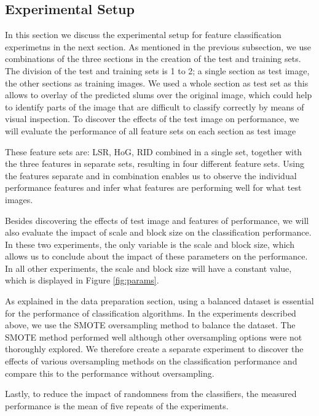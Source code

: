 \subsection{Experimental Setup}

In this section we discuss the experimental setup for feature classification experimetns in the next section. As mentioned in the previous subsection, we use combinations of the three sections in the creation of the test and training sets. The division of the test and training sets is 1 to 2; a single section as test image, the other sections as training images. We used a whole section as test set as this allows to overlay of the predicted slums over the original image, which could help to identify parts of the image that are difficult to classify correctly by means of visual inspection. To discover the effects of the test image on performance, we will evaluate the performance of all feature sets on each section as test image

These feature sets are: LSR, HoG, RID combined in a single set, together with the three features in separate sets, resulting in four different feature sets. Using the features separate and in combination enables us to observe the individual performance features and infer what features are performing well for what test images.

Besides discovering the effects of test image and features of performance, we will also evaluate the impact of scale and block size on the classification performance. In these two experiments, the only variable is the scale and block size, which allows us to conclude about the impact of these parameters on the performance. In all other experiments, the scale and block size will have a constant value, which is displayed in Figure \ref{fig:params}.


As explained in the data preparation section, using a balanced dataset is essential for the performance of classification algorithms. In the experiments described above, we use the SMOTE oversampling method to balance the dataset. The SMOTE method performed well although other oversampling options were not thoroughly explored. We therefore create a separate experiment to discover the effects of various oversampling methods on the classification performance and compare this to the performance without oversampling. 

Lastly, to reduce the impact of randomness from the classifiers, the measured performance is the mean of five repeats of the experiments.

